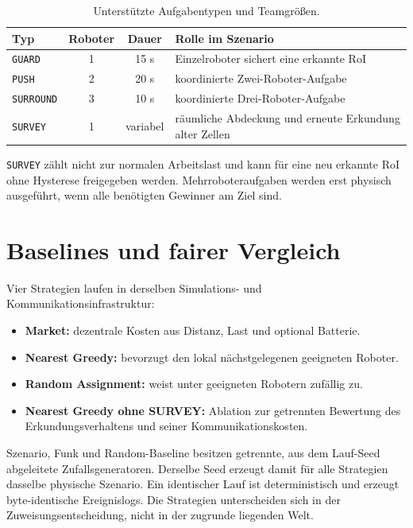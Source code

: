 \documentclass[11pt,a4paper]{article}
\begin{document}
\begin{table}[H]
\centering
\begin{tabularx}{0.92\textwidth}{@{}l c c X@{}}
\toprule
Typ & Roboter & Dauer & Rolle im Szenario\\
\midrule
\texttt{GUARD} & 1 & 15 s & Einzelroboter sichert eine erkannte RoI\\
\texttt{PUSH} & 2 & 20 s & koordinierte Zwei-Roboter-Aufgabe\\
\texttt{SURROUND} & 3 & 10 s & koordinierte Drei-Roboter-Aufgabe\\
\texttt{SURVEY} & 1 & variabel & räumliche Abdeckung und erneute Erkundung alter Zellen\\
\bottomrule
\end{tabularx}
\caption{Unterstützte Aufgabentypen und Teamgrößen.}
\end{table}

\texttt{SURVEY} zählt nicht zur normalen Arbeitslast und kann für eine neu erkannte RoI
ohne Hysterese freigegeben werden. Mehrroboteraufgaben werden erst physisch ausgeführt,
wenn alle benötigten Gewinner am Ziel sind.

\section{Baselines und fairer Vergleich}

Vier Strategien laufen in derselben Simulations- und Kommunikationsinfrastruktur:

\begin{itemize}
  \item \textbf{Market:} dezentrale Kosten aus Distanz, Last und optional Batterie.
  \item \textbf{Nearest Greedy:} bevorzugt den lokal nächstgelegenen geeigneten Roboter.
  \item \textbf{Random Assignment:} weist unter geeigneten Robotern zufällig zu.
  \item \textbf{Nearest Greedy ohne SURVEY:} Ablation zur getrennten Bewertung des
        Erkundungsverhaltens und seiner Kommunikationskosten.
\end{itemize}

Szenario, Funk und Random-Baseline besitzen getrennte, aus dem Lauf-Seed abgeleitete
Zufallsgeneratoren. Derselbe Seed erzeugt damit für alle Strategien dasselbe physische
Szenario. Ein identischer Lauf ist deterministisch und erzeugt byte-identische
Ereignislogs. Die Strategien unterscheiden sich in der Zuweisungsentscheidung, nicht in
der zugrunde liegenden Welt.
\end{document}
